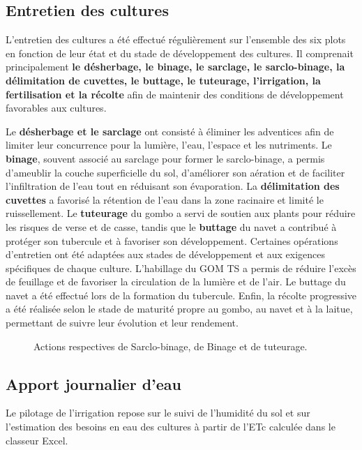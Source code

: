 \subsection{Entretien des cultures}
L’entretien des cultures a été effectué régulièrement sur l’ensemble des six plots en fonction de leur état et du stade de développement des cultures. Il comprenait principalement \textbf{le désherbage, le binage, le sarclage, le sarclo-binage, la délimitation de cuvettes, le buttage, le tuteurage, l’irrigation, la fertilisation et la récolte} afin de maintenir des conditions de développement favorables aux cultures.

Le \textbf{désherbage et le sarclage} ont consisté à éliminer les adventices afin de limiter leur concurrence pour la lumière, l’eau, l’espace et les nutriments. Le \textbf{binage}, souvent associé au sarclage pour former le sarclo-binage, a permis d’ameublir la couche superficielle du sol, d’améliorer son aération et de faciliter l’infiltration de l’eau tout en réduisant son évaporation. La \textbf{délimitation des cuvettes} a favorisé la rétention de l’eau dans la zone racinaire et limité le ruissellement. Le \textbf{tuteurage} du gombo a servi de soutien aux plants pour réduire les risques de verse et de casse, tandis que le \textbf{buttage} du navet a contribué à protéger son tubercule et à favoriser son développement.
Certaines opérations d’entretien ont été adaptées aux stades de développement et aux exigences spécifiques de chaque culture. L’habillage du GOM TS a permis de réduire l’excès de feuillage et de favoriser la circulation de la lumière et de l’air. Le buttage du navet a été effectué lors de la formation du tubercule. Enfin, la récolte progressive a été réalisée selon le stade de maturité propre au gombo, au navet et à la laitue, permettant de suivre leur évolution et leur rendement.
\begin{figure}[H]
    \centering
    \caption{Actions respectives de Sarclo-binage, de Binage et de tuteurage. }
    \label{fig:entretient3}
\end{figure}

\subsection{Apport journalier d’eau}
Le pilotage de l’irrigation repose sur le suivi de l’humidité du sol et sur l’estimation des besoins en eau des cultures à partir de l’ETc calculée dans le classeur Excel.

